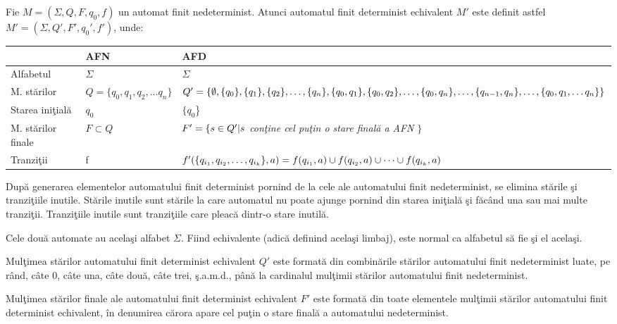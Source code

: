 Fie $M=(\Sigma, Q, F, q_{0}, f)$ un automat finit nedeterminist. Atunci automatul finit determinist echivalent $M'$ este definit astfel $M'=(\Sigma, Q', F', q_{0}', f')$, unde:

\begin{center}
  \begin{tabular}{| l | l | p{5cm} | }
    \hline
    & AFN & AFD \\ \hline
    Alfabetul & $ \Sigma $ & $ \Sigma $\\ \hline
    M. stărilor & $Q=\{q_{0}, q_{1}, q_{2}, \dots q_{n}\}$ & $Q'=\{ \emptyset, \{q_{0}\}, \{q_{1}\}, \{q_{2}\}, \linebreak \dots, \{q_{n}\}, \{q_{0}, q_{1}\}, \{q_{0}, q_{2}\}, \dots, \linebreak \{q_{0}, q_{n}\}, \dots, \{q_{n-1}, q_{n}\}, \dots, \linebreak \{q_{0}, q_{1}, \dots q_{n}\} \}$ \\ \hline
    Starea iniţială & $q_{0}$ & $\{q_{0}$\} \\ \hline
    M. stărilor finale & $F \subset Q$ & $F'=\{s \in Q'| \linebreak s$ \textit{conţine cel puţin o stare finală  a AFN} $\}$ \\ \hline
    Tranziţii & f & $f'(\{ q_{i_{1}}, q_{i_{2}}, \dots, q_{i_{k}} \}, a)= \linebreak f(q_{i_{1}}, a) \cup f(q_{i_{2}}, a) \cup \dots \cup f(q_{i_{k}}, a)$ \\ \hline
  \end{tabular}
\end{center}

După generarea elementelor automatului finit determinist pornind de la cele ale automatului finit nedeterminist, se elimina stările şi tranziţiile inutile. Stările inutile sunt stările la care automatul nu poate ajunge pornind din starea iniţială şi făcând una sau mai multe tranziţii. Tranziţiile inutile sunt tranziţiile care pleacă dintr-o stare inutilă.

Cele două automate au acelaşi alfabet $ \Sigma $. Fiind echivalente (adică definind acelaşi limbaj), este normal ca alfabetul să fie şi el acelaşi. 

Mulţimea stărilor automatului finit determinist echivalent $ Q' $ este formată din combinările stărilor automatului finit nedeterminist luate, pe rând, câte 0, câte una, câte două, câte trei, ş.a.m.d., până la cardinalul mulţimii stărilor automatului finit nedeterminist. 

Mulţimea stărilor finale ale automatului finit determinist echivalent $ F' $ este formată din toate elementele mulţimii stărilor automatului finit determinist echivalent, în denumirea cărora apare cel puţin o stare finală a automatului nedeterminist. 

